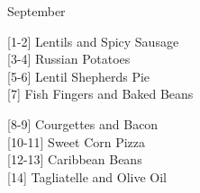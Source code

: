 		\begin{menu}{September}
    
    \begin{recipelist}
    
        {\scriptsize[1-2]} Lentils and Spicy Sausage\\
        {\scriptsize[3-4]} Russian Potatoes\\
        {\scriptsize[5-6]} Lentil Shepherds Pie\\
        {\scriptsize[7]} Fish Fingers and Baked Beans\\%
    \end{recipelist}%
    \begin{recipelist}
    
        {\scriptsize[8-9]} Courgettes and Bacon\\
        {\scriptsize[10-11]} Sweet Corn Pizza\\
        {\scriptsize[12-13]} Caribbean Beans\\
        {\scriptsize[14]} Tagliatelle and Olive Oil\\%
    \end{recipelist}\par%
  

\end{menu}
